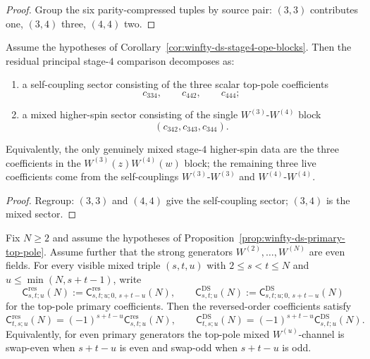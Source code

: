 \begin{proof}
Group the six parity-compressed tuples by source pair: $(3,3)$ contributes one, $(3,4)$ three, $(4,4)$ two.
\end{proof}

\begin{corollary}
\label{cor:winfty-ds-stage4-mixed-self-split}
Assume the hypotheses of
Corollary~\ref{cor:winfty-ds-stage4-ope-blocks}. Then the residual
principal stage-$4$ comparison decomposes as:
\begin{enumerate}[label=\textup{(\roman*)}]
\item a self-coupling sector consisting of the three scalar top-pole
 coefficients
 \[
 c_{334},\qquad c_{442},\qquad c_{444};
 \]
\item a mixed higher-spin sector consisting of the single
 $W^{(3)}$-$W^{(4)}$ block
 \[
 (c_{342},c_{343},c_{344}).
 \]
\end{enumerate}
Equivalently, the only genuinely mixed stage-$4$ higher-spin data are
the three coefficients in the $W^{(3)}(z)W^{(4)}(w)$ block; the
remaining three live coefficients come from the self-couplings
$W^{(3)}$-$W^{(3)}$ and $W^{(4)}$-$W^{(4)}$.
\end{corollary}

\begin{proof}
Regroup: $(3,3)$ and $(4,4)$ give the self-coupling sector; $(3,4)$ is the mixed sector.
\end{proof}

\begin{proposition}
\label{prop:winfty-ds-mixed-top-pole-swap}
Fix $N \ge 2$ and assume the hypotheses of
Proposition~\ref{prop:winfty-ds-primary-top-pole}. Assume further
that the strong generators $W^{(2)},\dots,W^{(N)}$ are even fields.
For every visible mixed triple $(s,t,u)$ with $2 \le s < t \le N$ and
$u \le \min(N,s+t-1)$, write
\[
\mathsf{C}^{\mathrm{res}}_{s,t;u}(N)
:=
\mathsf{C}^{\mathrm{res}}_{s,t;u;0,\,s+t-u}(N),
\qquad
\mathsf{C}^{\mathrm{DS}}_{s,t;u}(N)
:=
\mathsf{C}^{\mathrm{DS}}_{s,t;u;0,\,s+t-u}(N)
\]
for the top-pole primary coefficients. Then the reversed-order
coefficients satisfy
\[
\mathsf{C}^{\mathrm{res}}_{t,s;u}(N)
=
(-1)^{s+t-u}\mathsf{C}^{\mathrm{res}}_{s,t;u}(N),
\qquad
\mathsf{C}^{\mathrm{DS}}_{t,s;u}(N)
=
(-1)^{s+t-u}\mathsf{C}^{\mathrm{DS}}_{s,t;u}(N).
\]
Equivalently, for even primary generators the top-pole mixed
$W^{(u)}$-channel is swap-even when $s+t-u$ is even and swap-odd when
$s+t-u$ is odd.
\end{proposition}

